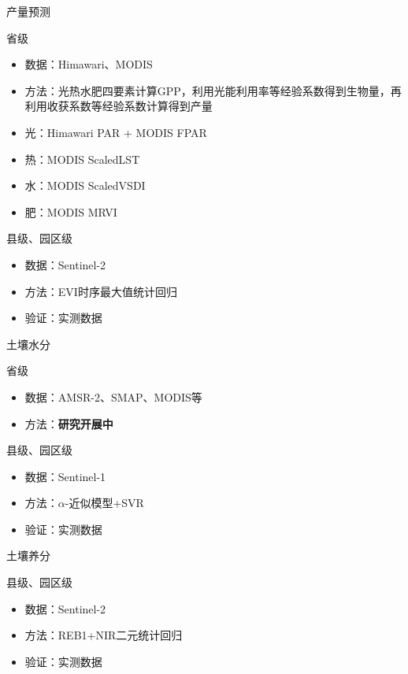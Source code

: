 \documentclass{beamer}
\begin{document}
\begin{frame}{产量预测}
		\begin{block}{省级}
		\begin{itemize}
			\item 数据：Himawari、MODIS
			\item 方法：光热水肥四要素计算GPP，利用光能利用率等经验系数得到生物量，再利用收获系数等经验系数计算得到产量
			\item 光：Himawari PAR + MODIS FPAR
			\item 热：MODIS ScaledLST
			\item 水：MODIS ScaledVSDI
			\item 肥：MODIS MRVI
		\end{itemize}
	\end{block}
	
	\begin{block}{县级、园区级}
		\begin{itemize}
			\item 数据：Sentinel-2
			\item 方法：EVI时序最大值统计回归
			\item 验证：实测数据
		\end{itemize}
	\end{block}
\end{frame}
\begin{frame}{土壤水分}
		\begin{block}{省级}
		\begin{itemize}
			\item 数据：AMSR-2、SMAP、MODIS等
			\item 方法：\textbf{研究开展中}
		\end{itemize}
	\end{block}
	
	\begin{block}{县级、园区级}
		\begin{itemize}
			\item 数据：Sentinel-1
			\item 方法：$\alpha$-近似模型+SVR
			\item 验证：实测数据
		\end{itemize}
	\end{block}
\end{frame}
\begin{frame}{土壤养分}
	\begin{block}{县级、园区级}
		\begin{itemize}
			\item 数据：Sentinel-2
			\item 方法：REB1+NIR二元统计回归
			\item 验证：实测数据
		\end{itemize}
	\end{block}
\end{frame}
\end{document}

